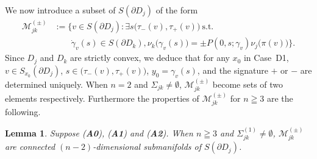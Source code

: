\documentclass[a4paper,11pt,reqno]{amsart}
\numberwithin{equation}{section}
\newtheorem{lemma}[theorem]{Lemma}
\theoremstyle{definition}
\theoremstyle{remark}
\begin{document}
%
%
We now introduce a subset of $S(\partial{D_j})$ of the form   
%
%
\begin{align*}
  \mathcal{M}_{jk}^{(\pm)}
& :=
  \bigl\{
  v \in S(\partial{D_j})
  : 
  \exists s \bigl(\tau_-(v),\tau_+(v)\bigr)
  \ \text{s.t.}\ 
\\
& \qquad
  \dot{\gamma}_v(s) \in S(\partial{D_k}), 
  \nu_k\bigl(\gamma_v(s)\bigr)
  =
  \pm
  P(0,s;\gamma_v)\nu_j\bigl(\pi(v)\bigr)
  \bigr\}. 
\end{align*}
%
%
Since $D_j$ and $D_k$ are strictly convex, 
we deduce that for any $x_0$ in Case~D1, 
$v \in S_{x_0}(\partial{D_j})$, 
$s \in \bigl(\tau_-(v),\tau_+(v)\bigr)$, 
$y_0=\gamma_v(s)$, 
and the signature $+$ or $-$ are determined uniquely. 
When $n=2$ and $\Sigma_{jk}\ne\emptyset$, 
$\mathcal{M}_{jk}^{(\pm)}$ become sets of two elements respectively. 
Furthermore the properties of $\mathcal{M}_{jk}^{(\pm)}$ 
for $n\geqq3$ are the following. 
%
%
\begin{lemma}
\label{theorem:mjk} 
Suppose {\rm ({\bf A0})}, {\rm ({\bf A1})} and {\rm ({\bf A2})}. 
When $n\geqq3$ and $\Sigma_{jk}^{(1)}\ne\emptyset$, 
$\mathcal{M}_{jk}^{(\pm)}$ are connected $(n-2)$-dimensional 
submanifolds of $S(\partial{D_j})$. 
\end{lemma}
%
%
\end{document}
